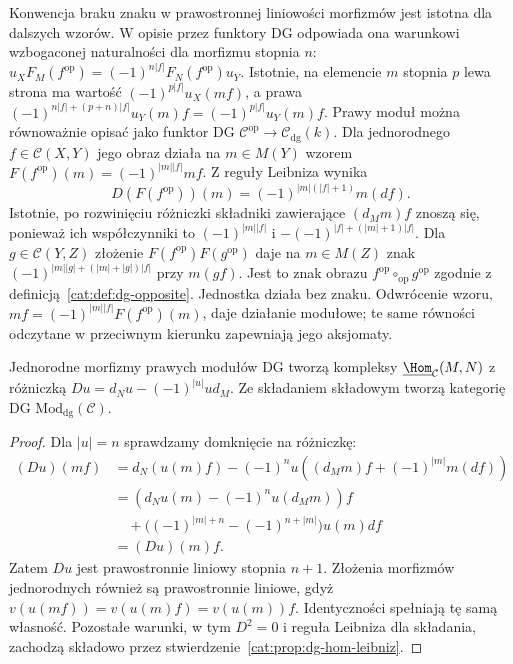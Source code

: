 Konwencja braku znaku w prawostronnej liniowości morfizmów jest istotna dla dalszych wzorów. W opisie przez funktory DG odpowiada ona warunkowi wzbogaconej naturalności dla morfizmu stopnia $n$: $u_X F_M(f^{\mathrm{op}})=(-1)^{n|f|}F_N(f^{\mathrm{op}})u_Y$. Istotnie, na elemencie $m$ stopnia $p$ lewa strona ma wartość $(-1)^{p|f|}u_X(mf)$, a prawa $(-1)^{n|f|+(p+n)|f|}u_Y(m)f=(-1)^{p|f|}u_Y(m)f$. Prawy moduł można równoważnie opisać jako funktor DG $\mathcal C^{\mathrm{op}}\to\mathcal C_{\mathrm{dg}}(k)$. Dla jednorodnego $f\in\mathcal C(X,Y)$ jego obraz działa na $m\in M(Y)$ wzorem $F(f^{\mathrm{op}})(m)=(-1)^{|m||f|}mf$. Z reguły Leibniza wynika
\[
 D(F(f^{\mathrm{op}}))(m)=(-1)^{|m|(|f|+1)}m(df).
\]
Istotnie, po rozwinięciu różniczki składniki zawierające $(d_Mm)f$ znoszą się, ponieważ ich współczynniki to $(-1)^{|m||f|}$ i $-(-1)^{|f|+(|m|+1)|f|}$. Dla $g\in\mathcal C(Y,Z)$ złożenie $F(f^{\mathrm{op}})F(g^{\mathrm{op}})$ daje na $m\in M(Z)$ znak
$(-1)^{|m||g|+(|m|+|g|)|f|}$ przy $m(gf)$. Jest to znak obrazu $f^{\mathrm{op}}\circ_{\mathrm{op}}g^{\mathrm{op}}$ zgodnie z definicją~\ref{cat:def:dg-opposite}. Jednostka działa bez znaku. Odwrócenie wzoru, $mf=(-1)^{|m||f|}F(f^{\mathrm{op}})(m)$, daje działanie modułowe; te same równości odczytane w przeciwnym kierunku zapewniają jego aksjomaty.

\begin{stwierdzenie}\label{cat:prop:dg-module-category}
Jednorodne morfizmy prawych modułów DG tworzą kompleksy $\underline{\Hom}_{\mathcal C}(M,N)$ z różniczką $Du=d_Nu-(-1)^{|u|}ud_M$. Ze składaniem składowym tworzą kategorię DG $\mathrm{Mod}_{\mathrm{dg}}(\mathcal C)$.
\end{stwierdzenie}
\begin{proof}
Dla $|u|=n$ sprawdzamy domknięcie na różniczkę:
\[
\begin{aligned}
 (Du)(mf)
 &=d_N(u(m)f)-(-1)^nu((d_Mm)f+(-1)^{|m|}m(df))\\
 &=(d_Nu(m)-(-1)^nu(d_Mm))f\\
 &\quad+\bigl((-1)^{|m|+n}-(-1)^{n+|m|}\bigr)u(m)df\\
 &=(Du)(m)f .
\end{aligned}
\]
Zatem $Du$ jest prawostronnie liniowy stopnia $n+1$. Złożenia morfizmów jednorodnych również są prawostronnie liniowe, gdyż $v(u(mf))=v(u(m)f)=v(u(m))f$. Identyczności spełniają tę samą własność. Pozostałe warunki, w tym $D^2=0$ i reguła Leibniza dla składania, zachodzą składowo przez stwierdzenie~\ref{cat:prop:dg-hom-leibniz}.
\end{proof}

